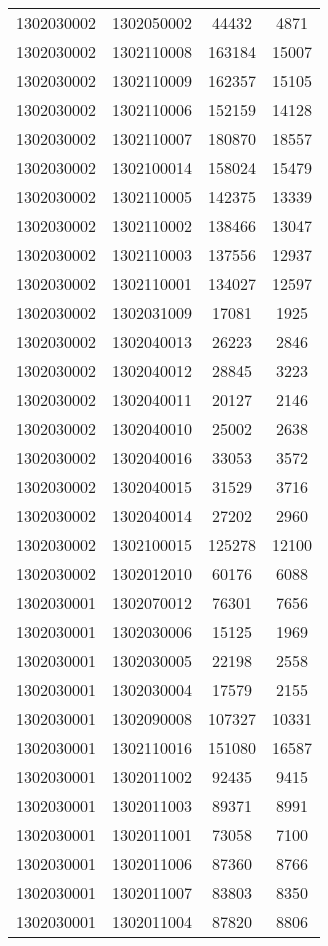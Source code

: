 \begin{longtable}[h]{llcc}
		1302030002 & 1302050002 & 44432 & 4871\\
		1302030002 & 1302110008 & 163184 & 15007\\
		1302030002 & 1302110009 & 162357 & 15105\\
		1302030002 & 1302110006 & 152159 & 14128\\
		1302030002 & 1302110007 & 180870 & 18557\\
		1302030002 & 1302100014 & 158024 & 15479\\
		1302030002 & 1302110005 & 142375 & 13339\\
		1302030002 & 1302110002 & 138466 & 13047\\
		1302030002 & 1302110003 & 137556 & 12937\\
		1302030002 & 1302110001 & 134027 & 12597\\
		1302030002 & 1302031009 & 17081 & 1925\\
		1302030002 & 1302040013 & 26223 & 2846\\
		1302030002 & 1302040012 & 28845 & 3223\\
		1302030002 & 1302040011 & 20127 & 2146\\
		1302030002 & 1302040010 & 25002 & 2638\\
		1302030002 & 1302040016 & 33053 & 3572\\
		1302030002 & 1302040015 & 31529 & 3716\\
		1302030002 & 1302040014 & 27202 & 2960\\
		1302030002 & 1302100015 & 125278 & 12100\\
		1302030002 & 1302012010 & 60176 & 6088\\
		1302030001 & 1302070012 & 76301 & 7656\\
		1302030001 & 1302030006 & 15125 & 1969\\
		1302030001 & 1302030005 & 22198 & 2558\\
		1302030001 & 1302030004 & 17579 & 2155\\
		1302030001 & 1302090008 & 107327 & 10331\\
		1302030001 & 1302110016 & 151080 & 16587\\
		1302030001 & 1302011002 & 92435 & 9415\\
		1302030001 & 1302011003 & 89371 & 8991\\
		1302030001 & 1302011001 & 73058 & 7100\\
		1302030001 & 1302011006 & 87360 & 8766\\
		1302030001 & 1302011007 & 83803 & 8350\\
		1302030001 & 1302011004 & 87820 & 8806\\

\end{longtable}
